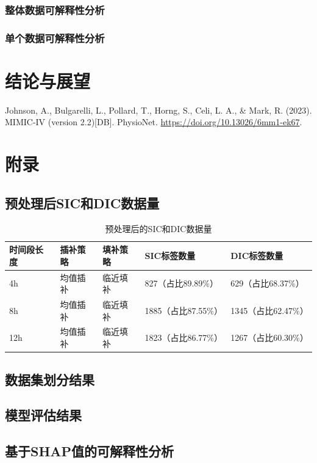 \documentclass[12pt, a4paper, oneside]{ctexart}
\numberwithin{equation}{section}  %
\begin{document}
\subsubsection{整体数据可解释性分析}
\subsubsection{单个数据可解释性分析}
\section{结论与展望}

\clearpage
\begin{thebibliography}{99}
     Johnson, A., Bulgarelli, L., Pollard, T., Horng, S., Celi, L. A., \& Mark, R. (2023). 
    MIMIC-IV (version 2.2)[DB]. PhysioNet. \url{https://doi.org/10.13026/6mm1-ek67}.
\end{thebibliography}
\clearpage
\appendix
\section{附录}
\subsection{预处理后SIC和DIC数据量}
\renewcommand\arraystretch{1.2} %
\begin{table}[H] %
    \centering %
    \begin{tabular}{p{}<{\centering}p{}<{\centering}p{}
        p{}p{}} %
        \toprule
        \textbf{时间段长度}&\textbf{插补策略}&\textbf{填补策略}&\textbf{SIC标签数量}&\textbf{DIC标签数量}\\
        \midrule
        4h&均值插补&临近填补&827（占比89.89\%）&629（占比68.37\%）\\
        8h&均值插补&临近填补&1885（占比87.55\%）&1345（占比62.47\%）\\
        12h&均值插补&临近填补&1823（占比86.77\%）&1267（占比60.30\%）\\
        \bottomrule
    \end{tabular}
    \caption{预处理后的SIC和DIC数据量}
    \label{table-sic-dic}
\end{table}
\subsection{数据集划分结果}
\subsection{模型评估结果}
\subsection{基于SHAP值的可解释性分析}
\end{document}

